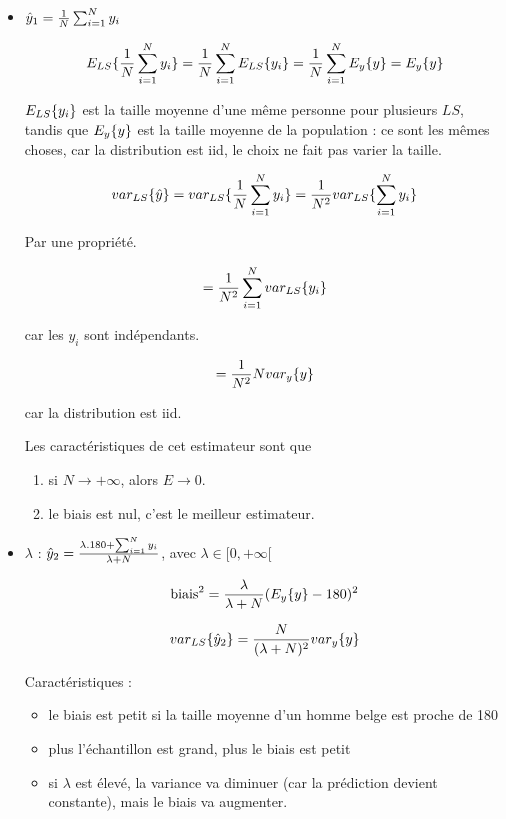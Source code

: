 	\begin{itemize}
		\item $\hat{y}_1 = \frac{1}{N} \sum_{i = 1}^N y_i$
		
		$$E_{LS}\{\frac{1}{N} \sum_{i = 1}^N y_i\} = \frac{1}{N} \sum_{i = 1}^N E_{LS}\{y_i\} = \frac{1}{N} \sum_{i = 1}^N E_y\{y\} = E_y\{y\}$$
		
		$E_{LS}\{y_i\}$ est la taille moyenne d'une même personne pour plusieurs $LS$, tandis que $E_y\{y\}$ est la taille moyenne de la population : ce sont les mêmes choses, car la distribution est iid, le choix ne fait pas varier la taille.
		
		$$var_{LS}\{\hat{y}\} = var_{LS}\{\frac{1}{N} \sum_{i = 1}^N y_i\} = \frac{1}{N^2} var_{LS}\{\sum_{i = 1}^N y_i\}$$
		
		Par une propriété.
		
		$$= \frac{1}{N^2} \sum_{i = 1}^N var_{LS}\{y_i\}$$
		
		car les $y_i$ sont indépendants.
		
		$$= \frac{1}{N^2} N var_y\{y\}$$
		
		car la distribution est iid.
		
		Les caractéristiques de cet estimateur sont que
		
		\begin{enumerate}
			\item si $N \rightarrow + \infty$, alors $E \rightarrow 0$.
			\item le biais est nul, c'est le meilleur estimateur.			
		\end{enumerate}
		
		\item $\lambda$ : $\hat{y}_2 = \frac{\lambda . 180 + \sum_{i = 1}^N y_i}{\lambda + N}$, avec $\lambda \in [ 0, +\infty [ $
		
		$$\text{biais}^2 = \frac{\lambda}{\lambda + N} (E_y\{y\} - 180)^2$$
		
		$$var_{LS}\{\hat{y}_2\} = \frac{N}{(\lambda + N)^2} var_y\{y\}$$
		
		Caractéristiques :
		
		\begin{itemize}
			\item le biais est petit si la taille moyenne d'un homme belge est proche de 180
			\item plus l'échantillon est grand, plus le biais est petit
			\item si $\lambda$ est élevé, la variance va diminuer (car la prédiction devient constante), mais le biais va augmenter.
		\end{itemize}
	\end{itemize}
	
